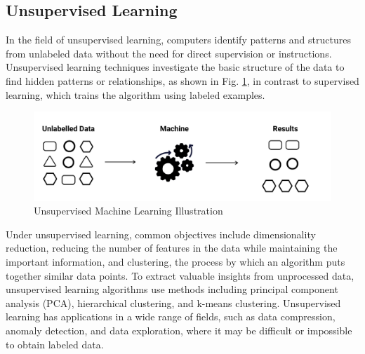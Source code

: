    \subsection{Unsupervised Learning}
   In the field of unsupervised learning, computers identify patterns and structures from unlabeled data without the need for direct supervision or instructions. Unsupervised learning techniques investigate the basic structure of the data to find hidden patterns or relationships, as shown in Fig. \ref{fig:USL}, in contrast to supervised learning, which trains the algorithm using labeled examples.
   \begin{figure}[H]
            \centering
            \includegraphics[width=0.9\linewidth]{Images/unsupervised.png}
            \caption{Unsupervised Machine Learning Illustration \cite{Raj_2022}}
            \label{fig:USL}
    \end{figure}
   Under unsupervised learning, common objectives include dimensionality reduction, reducing the number of features in the data while maintaining the important information, and clustering, the process by which an algorithm puts together similar data points. To extract valuable insights from unprocessed data, unsupervised learning algorithms use methods including principal component analysis (PCA), hierarchical clustering, and k-means clustering. Unsupervised learning has applications in a wide range of fields, such as data compression, anomaly detection, and data exploration, where it may be difficult or impossible to obtain labeled data.\clearpage
